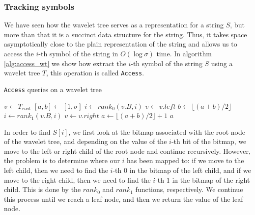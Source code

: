 \subsubsection*{Tracking symbols}
We have seen how the wavelet tree serves as a representation for a string $S$, but more than that it is a succinct data structure for the string. Thus, it takes space asymptotically close to the plain representation of the string and allows us to access the $i$-th symbol of the string in $O(\log \sigma)$ time. In algorithm \ref{alg:access_wt} we show how extract the $i$-th symbol of the string $S$ using a wavelet tree $T$, this operation is called \texttt{Access}. \vspace{0.4cm}

\begin{algorithm}[h!]
    \caption{\texttt{Access} queries on a wavelet tree}\label{alg:access_wt}
    \begin{algorithmic}
         
        \State $v \gets T_{root}$ 
        \State $[a,b] \gets [1,\sigma]$
         
        \State $i \gets rank_0(v.B,i)$
        \State $v \gets v.left$ 
        \State $b \gets \lfloor (a+b)/2 \rfloor$
        \Else
        \State $i \gets rank_1(v.B,i)$
        \State $v \gets v.right$ 
        \State $a \gets \lfloor (a+b)/2 \rfloor +1$
        \EndIf
        \EndWhile
        \State \Return $a$
        \EndFunction
    \end{algorithmic}
\end{algorithm}

\noindent In order to find $S[i]$, we first look at the bitmap associated with the root node of the wavelet tree, and depending on the value of the $i$-th bit of the bitmap, we move to the left or right child of the root node and continue recursively. However, the problem is to determine where our $i$ has been mapped to: if we move to the left child, then we need to find the $i$-th 0 in the bitmap of the left child, and if we move to the right child, then we need to find the $i$-th 1 in the bitmap of the right child. This is done by the $rank_0$ and $rank_1$ functions, respectively. We continue this process until we reach a leaf node, and then we return the value of the leaf node.

